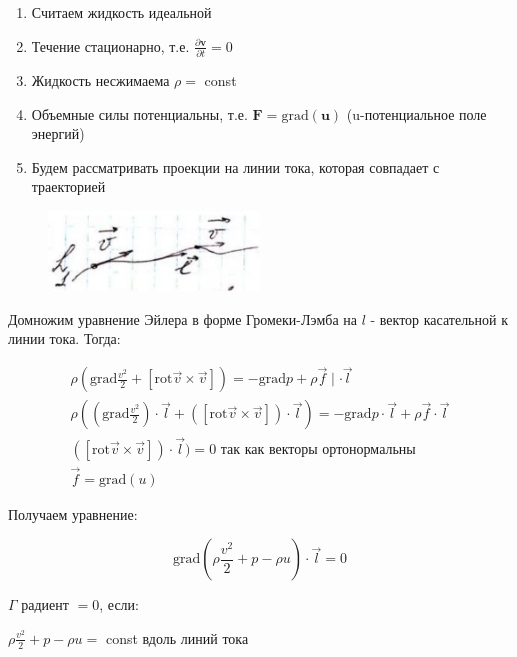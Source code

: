 \begin{enumerate}
  \item Считаем жидкость идеальной

  \item Течение стационарно, т.е. $\frac{\partial \mathbf{v}}{\partial t}=0$

  \item Жидкость несжимаема $\rho=$ const

  \item Объемные силы потенциальны, т.е. $\mathbf{F}=\mathrm{grad}(\mathbf{u})$ (u-потенциальное поле энергий)

  \item Будем рассматривать проекции на линии тока, которая совпадает с траекторией

\end{enumerate}


\begin{figure}[h!]
    \centering
    \includegraphics[width=0.5\textwidth]{2023_05_21_6e9b4e8657e82b213c6ag-14(2)}
\end{figure}

Домножим уравнение Эйлера в форме Громеки-Лэмба на $l$ - вектор касательной к линии тока. Тогда:

$$
\begin{gathered}
\rho\left(\mathrm{grad} \frac{v^{2}}{2}+[\mathrm{rot} \vec{v} \times \vec{v}]\right)=-\mathrm{grad} p+\rho \vec{f} \mid \cdot \vec{l} \\
\rho\left(\left(\mathrm{grad} \frac{v^{2}}{2}\right) \cdot \vec{l}+([\mathrm{rot} \vec{v} \times \vec{v}]) \cdot \vec{l}\right)=-\mathrm{grad} p\cdot \vec{l}+\rho \vec{f} \cdot \vec{l} \\
([\mathrm{rot} \vec{v} \times \vec{v}]) \cdot \vec{l})=0 \text { так как векторы ортонормальны } \\
\vec{f}=\mathrm{grad}(u)
\end{gathered}
$$

Получаем уравнение:

$$
\mathrm{grad}\left(\rho \frac{v^{2}}{2}+p-\rho u\right) \cdot \vec{l}=0
$$

$\Gamma$ радиент $=0$, если:

$\rho \frac{v^{2}}{2}+p-\rho u=$ const вдоль линий тока

